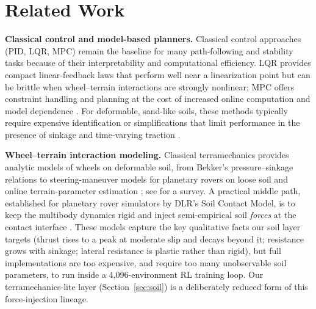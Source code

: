 \documentclass[conference]{IEEEtran}
\begin{document}
\section{Related Work}
\noindent\textbf{Classical control and model-based planners.} Classical control approaches (PID, LQR, MPC) remain the baseline for many path-following and stability tasks because of their interpretability and computational efficiency. LQR provides compact linear-feedback laws that perform well near a linearization point but can be brittle when wheel--terrain interactions are strongly nonlinear; MPC offers constraint handling and planning at the cost of increased online computation and model dependence \cite{mehta2024hybrid, zhang2023energy}. For deformable, sand-like soils, these methods typically require expensive identification or simplifications that limit performance in the presence of sinkage and time-varying traction \cite{bekker1969introduction, wong2008theory}.

\vspace{2mm}
\noindent\textbf{Wheel--terrain interaction modeling.} Classical terramechanics provides analytic models of wheels on deformable soil, from Bekker's pressure--sinkage relations \cite{bekker1969introduction, wong2008theory} to steering-maneuver models for planetary rovers on loose soil \cite{ishigami2007terramechanics} and online terrain-parameter estimation \cite{iagnemma2004online}; see \cite{taheri2015technical} for a survey. A practical middle path, established for planetary rover simulators by DLR's Soil Contact Model, is to keep the multibody dynamics rigid and inject semi-empirical soil \emph{forces} at the contact interface \cite{krenn2009scm}. These models capture the key qualitative facts our soil layer targets (thrust rises to a peak at moderate slip and decays beyond it; resistance grows with sinkage; lateral resistance is plastic rather than rigid), but full implementations are too expensive, and require too many unobservable soil parameters, to run inside a 4{,}096-environment RL training loop. Our terramechanics-lite layer (Section~\ref{sec:soil}) is a deliberately reduced form of this force-injection lineage.
\end{document}
